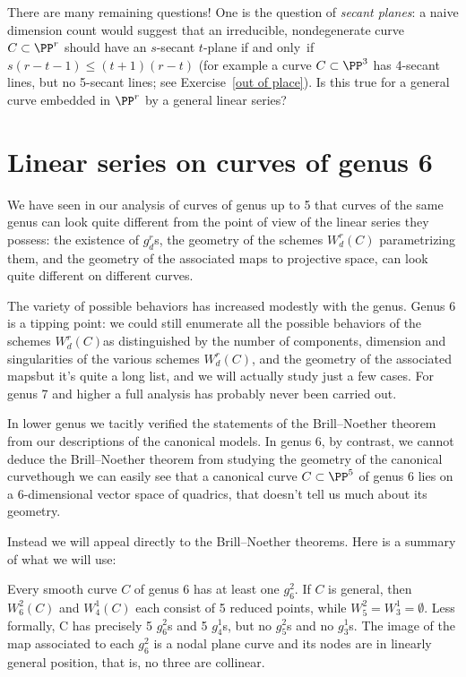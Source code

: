 There are many remaining questions! One is the question of \emph{secant
planes}: a naive dimension count would suggest that an irreducible,
nondegenerate curve $C \subset \PP^r$ should have an $s$-secant $t$-plane
if and only~if $s(r-t-1) \leq (t+1)(r-t)$
(for example a curve $C \subset \PP^3$ has 4-secant lines, but no
5-secant lines; see Exercise~\ref{out of place}). 
Is this true for a general curve embedded in $\PP^r$
by a general linear series?

\section{Linear series on curves of genus 6}
\label{genus 6 section}\label{general genus 6}

We have seen in our analysis of curves of genus up to 5 that curves of the
same genus can look quite different from the point of view of the linear
series they possess: the existence of $g^r_d$s,  the geometry of the
schemes $W^r_d(C)$ parametrizing them, and the geometry of the associated
maps to projective space, can look quite different on different curves.

The variety of possible behaviors has increased modestly with the
genus. Genus 6 is a tipping point: we could still enumerate all the
possible behaviors of the schemes $W^r_d(C)$\emdash as distinguished
by the number of components, dimension and singularities of the various
schemes $W^r_d(C)$, and the geometry of the associated maps\emdash but
it's quite a long list, and we will actually study just a few cases. For
genus 7 and higher a full analysis has probably never been carried out.

In lower genus we tacitly verified the statements of the Brill--Noether
theorem from our descriptions of the canonical models. In genus 6, by
contrast, we cannot  deduce the Brill--Noether theorem from studying
the geometry of the canonical curve\emdash though we can easily see that
a canonical curve $C \subset \PP^5$ of genus 6 lies on a 6-dimensional
vector space of quadrics, that doesn't tell us much about its geometry.

Instead we will appeal directly to the Brill--Noether theorems. Here is
a summary of what we will use:

\begin{theorem}\label{BN consequences}
Every smooth curve $C$ of genus 6 has at least one $g^{2}_{6}$. If $C$
is general, then
$W^{2}_{6}(C)$ and $W^{1}_{4}(C)$ each consist of 5 reduced points,
while $W^{2}_{5} = W^{1}_{3} = \emptyset$.  Less formally, C has
precisely 5 $g^{2}_{6}$s and 5 $g^{1}_{4}$s, but no $g^{2}_{5}$s and
no $g^{1}_{3}$s. The image of the map associated to each $g^{2}_{6}$
is a nodal plane curve and its nodes are in linearly general position,
that is, no three are collinear.
\end{theorem}

